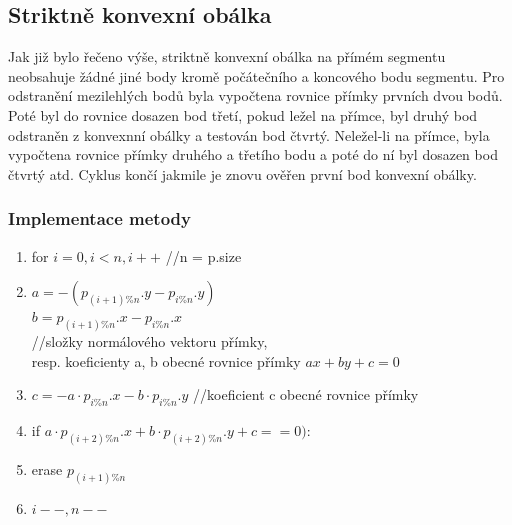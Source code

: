 \documentclass[a4paper, 12pt]{article}
\begin{document}
\vspace{1,5cm}


\subsection{Striktně konvexní obálka}
Jak již bylo řečeno výše, striktně konvexní obálka na přímém segmentu neobsahuje žádné jiné body kromě počátečního a koncového bodu segmentu. Pro odstranění mezilehlých bodů byla vypočtena rovnice přímky prvních dvou bodů. Poté byl do rovnice dosazen bod třetí, pokud ležel na přímce, byl druhý bod odstraněn z konvexnní obálky a testován bod čtvrtý. Neležel-li na přímce, byla vypočtena rovnice přímky druhého a třetího bodu a poté do ní byl dosazen bod čtvrtý atd. Cyklus končí jakmile je znovu ověřen první bod konvexní obálky.

\subsubsection{Implementace metody}
\begin{enumerate}
	
	\item for $i = 0, i< n, i++$ //n = p.size
	\item \hspace{1.5cm} $a = -(p_{(i+1)\%n}.y - p_{i\%n}.y)$\\ 
	\indent \hspace{1.5cm} $b = p_{(i+1)\%n}.x - p_{i\%n}.x$ \\
	\indent \hspace{1.5cm}//složky normálového vektoru přímky,\\ 
	\indent \hspace{1.5cm} resp. koeficienty a, b obecné rovnice přímky $ax+by+c = 0$
	\item \hspace{1.5cm} $c = - a \cdot p_{i\%n}.x - b \cdot p_{i\%n}.y$ //koeficient c obecné rovnice přímky
	\item \hspace{1.5cm} if $a\cdot p_{(i+2)\%n}.x + b \cdot p_{(i+2)\%n}.y +c == 0)$: 
	\item \hspace{2.5cm}erase $p_{(i+1)\%n}$
	\item \hspace{2.5cm}$i -- , n --	$
	
\end{enumerate}

\clearpage
\end{document}
